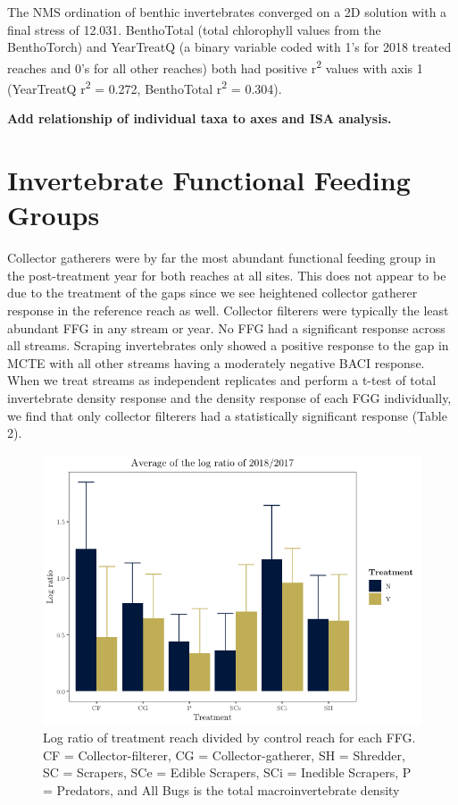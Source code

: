 \documentclass[double,12pt]{beavtex}
\begin{document}
  The NMS ordination of benthic invertebrates converged on a 2D solution
  with a final stress of 12.031. BenthoTotal (total chlorophyll values
  from the BenthoTorch) and YearTreatQ (a binary variable coded with 1's
  for 2018 treated reaches and 0's for all other reaches) both had
  positive r\textsuperscript{2} values with axis 1 (YearTreatQ
  r\textsuperscript{2} = 0.272, BenthoTotal r\textsuperscript{2} = 0.304).
  
  \textbf{Add relationship of individual taxa to axes and ISA analysis.}
  
  \section*{Invertebrate Functional Feeding
  Groups}\label{invertebrate-functional-feeding-groups}
  
  Collector gatherers were by far the most abundant functional feeding
  group in the post-treatment year for both reaches at all sites. This
  does not appear to be due to the treatment of the gaps since we see
  heightened collector gatherer response in the reference reach as well.
  Collector filterers were typically the least abundant FFG in any stream
  or year. No FFG had a significant response across all streams. Scraping
  invertebrates only showed a positive response to the gap in MCTE with
  all other streams having a moderately negative BACI response. When we
  treat streams as independent replicates and perform a t-test of total
  invertebrate density response and the density response of each FGG
  individually, we find that only collector filterers had a statistically
  significant response (Table 2).
  
  \begin{figure}
  
  {\centering \includegraphics[width=0.6\linewidth]{Figures/AvgFFGratio-1} 
  
  }
  
  \caption[Log ratio of treatment reach divided by control reach for each FFG]{Log ratio of treatment reach divided by control reach for each FFG. CF = Collector-filterer, CG = Collector-gatherer, SH = Shredder, SC = Scrapers, SCe = Edible Scrapers, SCi = Inedible Scrapers, P = Predators, and All Bugs is the total macroinvertebrate density}\label{fig:unnamed-chunk-3}
  \end{figure}
  
\end{document}
